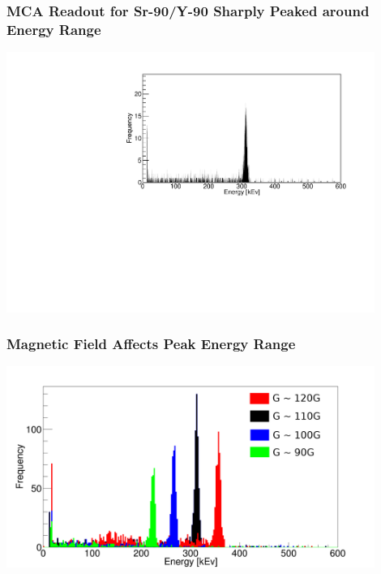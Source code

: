 \documentclass{beamer}
\begin{document}
\begin{frame}
  \frametitle{MCA Readout for Sr-90/Y-90 Sharply Peaked around Energy Range}
  \includegraphics[width=12cm]{mca-readout-clean.pdf}
\end{frame}
\begin{frame}
  \frametitle{Magnetic Field Affects Peak Energy Range}
  \includegraphics[width=12cm]{mca-readout-total.png}
\end{frame}
\end{document}
